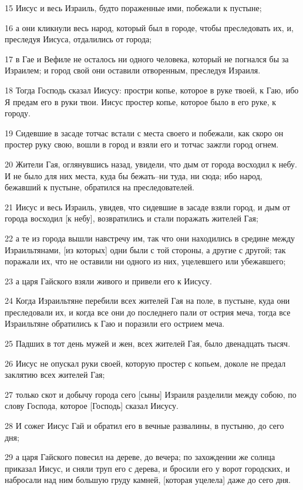 \par 15 Иисус и весь Израиль, будто пораженные ими, побежали к пустыне;
\par 16 а они кликнули весь народ, который был в городе, чтобы преследовать их, и, преследуя Иисуса, отдалились от города;
\par 17 в Гае и Вефиле не осталось ни одного человека, который не погнался бы за Израилем; и город свой они оставили отворенным, преследуя Израиля.
\par 18 Тогда Господь сказал Иисусу: простри копье, которое в руке твоей, к Гаю, ибо Я предам его в руки твои. Иисус простер копье, которое было в его руке, к городу.
\par 19 Сидевшие в засаде тотчас встали с места своего и побежали, как скоро он простер руку свою, вошли в город и взяли его и тотчас зажгли город огнем.
\par 20 Жители Гая, оглянувшись назад, увидели, что дым от города восходил к небу. И не было для них места, куда бы бежать--ни туда, ни сюда; ибо народ, бежавший к пустыне, обратился на преследователей.
\par 21 Иисус и весь Израиль, увидев, что сидевшие в засаде взяли город, и дым от города восходил [к небу], возвратились и стали поражать жителей Гая;
\par 22 а те из города вышли навстречу им, так что они находились в средине между Израильтянами, [из которых] одни были с той стороны, а другие с другой; так поражали их, что не оставили ни одного из них, уцелевшего или убежавшего;
\par 23 а царя Гайского взяли живого и привели его к Иисусу.
\par 24 Когда Израильтяне перебили всех жителей Гая на поле, в пустыне, куда они преследовали их, и когда все они до последнего пали от острия меча, тогда все Израильтяне обратились к Гаю и поразили его острием меча.
\par 25 Падших в тот день мужей и жен, всех жителей Гая, было двенадцать тысяч.
\par 26 Иисус не опускал руки своей, которую простер с копьем, доколе не предал заклятию всех жителей Гая;
\par 27 только скот и добычу города сего [сыны] Израиля разделили между собою, по слову Господа, которое [Господь] сказал Иисусу.
\par 28 И сожег Иисус Гай и обратил его в вечные развалины, в пустыню, до сего дня;
\par 29 а царя Гайского повесил на дереве, до вечера; по захождении же солнца приказал Иисус, и сняли труп его с дерева, и бросили его у ворот городских, и набросали над ним большую груду камней, [которая уцелела] даже до сего дня.
